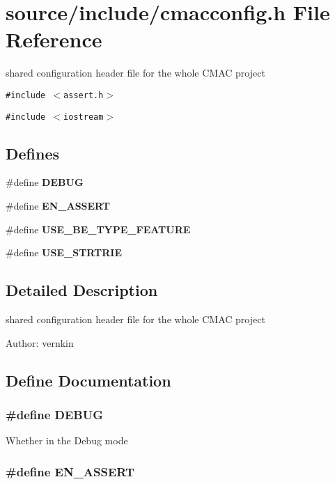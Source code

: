 \section{source/include/cmacconfig.h File Reference}
\label{cmacconfig_8h}
shared configuration header file for the whole CMAC project 

{\tt \#include $<$assert.h$>$}\par
{\tt \#include $<$iostream$>$}\par
\subsection*{Defines}
\begin{CompactItemize}
\item 
\#define {\bf DEBUG}
\item 
\#define {\bf EN\_\-ASSERT}
\item 
\#define {\bf USE\_\-BE\_\-TYPE\_\-FEATURE}
\item 
\#define {\bf USE\_\-STRTRIE}
\end{CompactItemize}


\subsection{Detailed Description}
shared configuration header file for the whole CMAC project 

\begin{Desc}
\item[Author:]vernkin \end{Desc}


\subsection{Define Documentation}
\subsubsection{\setlength{\rightskip}{0pt plus 5cm}\#define DEBUG}\label{cmacconfig_8h_d72dbcf6d0153db1b8d8a58001feed83}


Whether in the Debug mode 
\subsubsection{\setlength{\rightskip}{0pt plus 5cm}\#define EN\_\-ASSERT}\label{cmacconfig_8h_126df696f0f6a8d1ec5ab4bf14b20054}


